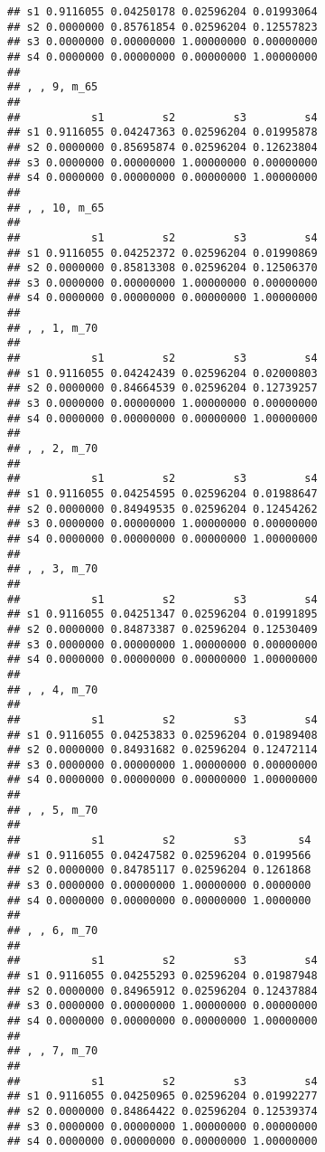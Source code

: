 \documentclass[
]{article}
\begin{document}
\begin{verbatim}
## s1 0.9116055 0.04250178 0.02596204 0.01993064
## s2 0.0000000 0.85761854 0.02596204 0.12557823
## s3 0.0000000 0.00000000 1.00000000 0.00000000
## s4 0.0000000 0.00000000 0.00000000 1.00000000
## 
## , , 9, m_65
## 
##           s1         s2         s3         s4
## s1 0.9116055 0.04247363 0.02596204 0.01995878
## s2 0.0000000 0.85695874 0.02596204 0.12623804
## s3 0.0000000 0.00000000 1.00000000 0.00000000
## s4 0.0000000 0.00000000 0.00000000 1.00000000
## 
## , , 10, m_65
## 
##           s1         s2         s3         s4
## s1 0.9116055 0.04252372 0.02596204 0.01990869
## s2 0.0000000 0.85813308 0.02596204 0.12506370
## s3 0.0000000 0.00000000 1.00000000 0.00000000
## s4 0.0000000 0.00000000 0.00000000 1.00000000
## 
## , , 1, m_70
## 
##           s1         s2         s3         s4
## s1 0.9116055 0.04242439 0.02596204 0.02000803
## s2 0.0000000 0.84664539 0.02596204 0.12739257
## s3 0.0000000 0.00000000 1.00000000 0.00000000
## s4 0.0000000 0.00000000 0.00000000 1.00000000
## 
## , , 2, m_70
## 
##           s1         s2         s3         s4
## s1 0.9116055 0.04254595 0.02596204 0.01988647
## s2 0.0000000 0.84949535 0.02596204 0.12454262
## s3 0.0000000 0.00000000 1.00000000 0.00000000
## s4 0.0000000 0.00000000 0.00000000 1.00000000
## 
## , , 3, m_70
## 
##           s1         s2         s3         s4
## s1 0.9116055 0.04251347 0.02596204 0.01991895
## s2 0.0000000 0.84873387 0.02596204 0.12530409
## s3 0.0000000 0.00000000 1.00000000 0.00000000
## s4 0.0000000 0.00000000 0.00000000 1.00000000
## 
## , , 4, m_70
## 
##           s1         s2         s3         s4
## s1 0.9116055 0.04253833 0.02596204 0.01989408
## s2 0.0000000 0.84931682 0.02596204 0.12472114
## s3 0.0000000 0.00000000 1.00000000 0.00000000
## s4 0.0000000 0.00000000 0.00000000 1.00000000
## 
## , , 5, m_70
## 
##           s1         s2         s3        s4
## s1 0.9116055 0.04247582 0.02596204 0.0199566
## s2 0.0000000 0.84785117 0.02596204 0.1261868
## s3 0.0000000 0.00000000 1.00000000 0.0000000
## s4 0.0000000 0.00000000 0.00000000 1.0000000
## 
## , , 6, m_70
## 
##           s1         s2         s3         s4
## s1 0.9116055 0.04255293 0.02596204 0.01987948
## s2 0.0000000 0.84965912 0.02596204 0.12437884
## s3 0.0000000 0.00000000 1.00000000 0.00000000
## s4 0.0000000 0.00000000 0.00000000 1.00000000
## 
## , , 7, m_70
## 
##           s1         s2         s3         s4
## s1 0.9116055 0.04250965 0.02596204 0.01992277
## s2 0.0000000 0.84864422 0.02596204 0.12539374
## s3 0.0000000 0.00000000 1.00000000 0.00000000
## s4 0.0000000 0.00000000 0.00000000 1.00000000

\end{verbatim}
\end{document}
